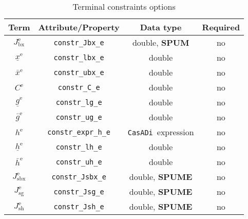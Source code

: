 \documentclass[english]{article}
\newcommand{\code}[1]{\texttt{#1}}
\newcommand{\casadi}{\texttt{CasADi}}
\newcommand{\ind}[1]{_{\textrm{#1}}}
\newcommand{\terminal}{^{\textrm{e}}}
\newcommand{\optional}{no}
\begin{document}
\begin{table}[ht!]
    \centering
    \caption{Terminal constraints options} \label{tab:constraints:terminal}
    \begin{tabular}{cccc}
        \toprule
        Term & Attribute/Property & Data type & Required \\ \midrule
        $J\ind{bx}\terminal$ & \code{constr\_Jbx\_e}    & double, \textbf{SPUM}   & \optional   \\
        $\underline{x}\terminal $    & \code{constr\_lbx\_e}     & double  & \optional   \\
        $\bar{x}\terminal $         & \code{constr\_ubx\_e}     & double   & \optional  \\ [1em]
        $ C\terminal $ & \code{constr\_C\_e}    & double   & \optional   \\
        $\underline{g}\terminal $    & \code{constr\_lg\_e}     & double   & \optional   \\
        $\bar{g}\terminal $         & \code{constr\_ug\_e}     & double   & \optional  \\ [1em]
        $ h\terminal $ & \code{constr\_expr\_h\_e}    & \casadi~expression   & \optional  \\
        $\underline{h}\terminal $    & \code{constr\_lh\_e}     & double   & \optional   \\
        $\bar{h}\terminal $         & \code{constr\_uh\_e}     & double  & \optional   \\ [1em]
        $ J\ind{sbx}\terminal $ & \code{constr\_Jsbx\_e} & double, \textbf{SPUME}   & \optional \\
        $ J\ind{sg}\terminal $ & \code{constr\_Jsg\_e} & double, \textbf{SPUME} & \optional  \\
        $ J\ind{sh}\terminal $ & \code{constr\_Jsh\_e} & double, \textbf{SPUME}  & \optional  \\
        \bottomrule
    \end{tabular}
\end{table}
%
%
\end{document}

